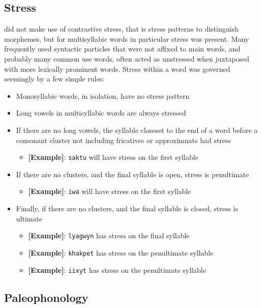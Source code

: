   \subsection{Stress}
  \langname did not make use of contrastive stress, that is stress patterns to distinguish morphemes, but for multisyllabic words in particular stress was present. Many frequently used syntactic particles that were not affixed to main words, and probably many common use words, often acted as unstressed when juxtaposed with more lexically prominent words. Stress within a word was governed seemingly by a few simple rules:\par
  \begin{itemize}
    \item Monosyllabic words, in isolation, have no stress pattern
    \item Long vowels in multisyllabic words are always stressed
    \item If there are no long vowels, the syllable closeset to the end of a word before a consonant cluster not including fricatives or approximnats had stress
    \begin{itemize}
      \item\textbf{[Example]}: \texttt{saktu} will have stress on the first syllable
    \end{itemize}
    \item If there are no clusters, and the final syllable is open, stress is penultimate
    \begin{itemize}
      \item\textbf{[Example]}: \texttt{iwa} will have stress on the first syllable
    \end{itemize}
    \item Finally, if there are no clusters, and the final syllable is closed, stress is ultimate
    \begin{itemize}
      \item\textbf{[Example]}: \texttt{lyagwyn} has stress on the final syllable
      \item\textbf{[Example]}: \texttt{khakpet} has stress on the penultimate syllable
      \item\textbf{[Example]}: \texttt{iixyt} has stress on the penultimate syllable
    \end{itemize}
  \end{itemize}

\subsection{Paleophonology}

